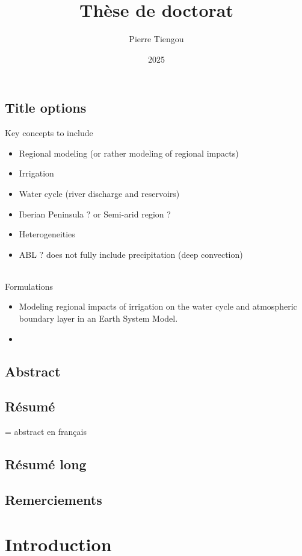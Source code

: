 \documentclass{report}
\begin{document}
\section*{Title options}
    Key concepts to include
    \begin{itemize}
        \item Regional modeling (or rather modeling of regional impacts)
        \item Irrigation
        \item Water cycle (river discharge and reservoirs)
        \item Iberian Peninsula ? or Semi-arid region ? 
        \item Heterogeneities
        \item ABL ? does not fully include precipitation (deep convection)
    \end{itemize}
    \hfill
    \\
    Formulations
    \begin{itemize}
        \item Modeling regional impacts of irrigation on the water cycle and atmospheric boundary layer in an Earth System Model.
        \item 
    \end{itemize}


\title{Thèse de doctorat}
\author{Pierre Tiengou }
\date{2025}
\maketitle

\section*{Abstract}
\section*{Résumé}
= abstract en français
\section*{Résumé long}
\section*{Remerciements}

\clearpage
\dominitoc
\renewcommand*\contentsname{Contents}
\tableofcontents
\newpage

\chapter{Introduction}
\minitoc

\end{document}
